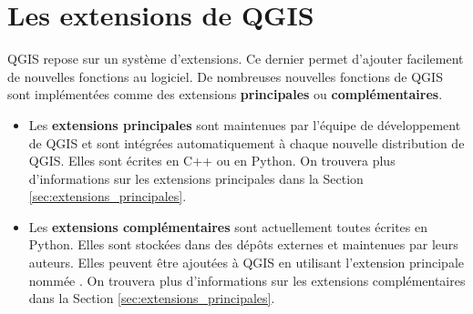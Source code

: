

\section{Les extensions de QGIS}\label{sec:extensions}



QGIS repose sur un syst\`eme d'extensions.
Ce dernier permet d'ajouter facilement de nouvelles fonctions au logiciel. 
De nombreuses nouvelles fonctions de QGIS sont impl\'ement\'ees comme des extensions \textbf{principales} ou \textbf{compl\'ementaires}.  


\begin{itemize}
\item Les \textbf{extensions principales} sont maintenues par l'\'equipe de d\'eveloppement de QGIS et sont int\'egr\'ees automatiquement \`a chaque nouvelle distribution de QGIS.
Elles sont \'ecrites en C++ ou en Python.
On trouvera plus d'informations sur les extensions principales dans la Section \ref{sec:extensions_principales}.
\item Les \textbf{extensions compl\'ementaires} sont actuellement toutes \'ecrites en Python.
Elles sont stock\'ees dans des d\'ep\^ots externes et maintenues par leurs auteurs.
Elles peuvent \^etre ajout\'ees \`a QGIS en utilisant l'extension principale nomm\'ee .
On trouvera plus d'informations sur les extensions compl\'ementaires dans la Section \ref{sec:extensions_principales}.
\end{itemize}

